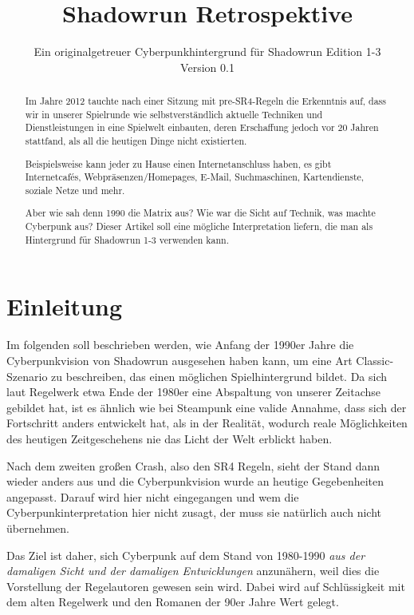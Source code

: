 \documentclass[a4paper]{scrartcl}
\title{Shadowrun Retrospektive}
\subtitle{Ein originalgetreuer Cyberpunkhintergrund für Shadowrun Edition 1-3\\Version 0.1}
\author{\small\projekturl}
\begin{document}
\maketitle

\begin{abstract}
Im Jahre 2012 tauchte nach einer Sitzung mit pre-SR4-Regeln die Erkenntnis auf, dass wir in unserer Spielrunde wie
selbstverständlich aktuelle Techniken und Dienstleistungen in eine Spielwelt einbauten, deren Erschaffung jedoch vor 20 
Jahren stattfand, als all die heutigen Dinge nicht existierten.

Beispielsweise kann jeder zu Hause einen Internetanschluss haben, es gibt Internetcafés, Webpräsenzen/Homepages, E-Mail, 
Suchmaschinen, Kartendienste, soziale Netze und mehr.

Aber wie sah denn 1990 die Matrix aus? Wie war die Sicht auf Technik, was machte Cyberpunk aus?
Dieser Artikel soll eine mögliche Interpretation liefern, die man als Hintergrund für Shadowrun 1-3 verwenden kann.
\end{abstract}

\tableofcontents

\section{Einleitung}
Im folgenden soll beschrieben werden, wie Anfang der 1990er Jahre die Cyberpunkvision von Shadowrun ausgesehen haben kann,
um eine Art \glqq Classic\grqq{}-Szenario zu beschreiben, das einen möglichen Spielhintergrund bildet.
Da sich laut Regelwerk etwa Ende der 1980er eine Abspaltung von unserer Zeitachse gebildet hat, ist es ähnlich wie bei Steampunk eine valide Annahme, dass sich der Fortschritt anders entwickelt hat, als in der Realität, wodurch reale Möglichkeiten des heutigen Zeitgeschehens nie das Licht der Welt erblickt haben.

Nach dem zweiten großen Crash, also den SR4 Regeln, sieht der Stand dann wieder anders aus und die Cyberpunkvision wurde an heutige Gegebenheiten angepasst.
Darauf wird hier nicht eingegangen und wem die Cyberpunkinterpretation hier nicht zusagt, der muss sie natürlich auch nicht übernehmen.

Das Ziel ist daher, sich Cyberpunk auf dem Stand von 1980-1990 \textit{aus der damaligen Sicht und der damaligen Entwicklungen} anzunähern, weil dies die Vorstellung der Regelautoren gewesen sein wird.
Dabei wird auf Schlüssigkeit mit dem alten Regelwerk und den Romanen der 90er Jahre Wert gelegt.
\end{document}
